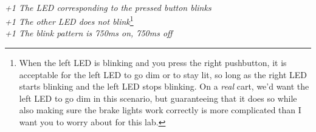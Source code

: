 \begin{enumerate}
{             \\
        \textit{+1 The LED corresponding to the pressed button blinks} \\
        \textit{+1 The other LED does not blink}\footnote{
            When the left LED is blinking and you press the right pushbutton, it is acceptable for the left LED to go dim or to stay lit, so long as the right LED starts blinking and the left LED stops blinking.
            On a \textit{real} cart, we'd want the left LED to go dim in this scenario, but guaranteeing that it does so while also making sure the brake lights work correctly is more complicated than I want you to worry about for this lab.
        } \\
        \textit{+1 The blink pattern is 750ms on, 750ms off}}


\end{enumerate}
